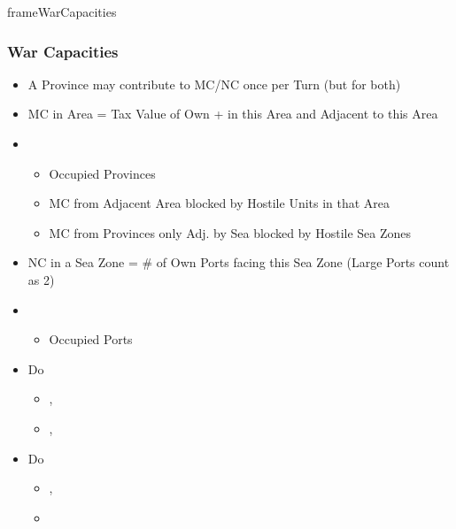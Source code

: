 \documentclass[10pt]{article}
\newlength{\fhWarCapacities} \setlength\fhWarCapacities{17\baselineskip}
\begin{document}
\begin{dynamiccontents*}{frameWarCapacities}\begin{eubox}{\fhWarCapacities}
	\subsubsection*{War Capacities }
	\begin{itemize}
		\item A Province may contribute to MC/NC once per Turn (but for both)
	\end{itemize}	
	\begin{itemize}
		\item MC in Area = Tax Value of Own \towns + \vassals in this Area and Adjacent to this Area
		\item {}
		\begin{itemize}
			\item Occupied Provinces
			\item MC from Adjacent Area blocked by Hostile Units in that Area
			\item MC from Provinces only Adj. by Sea blocked by Hostile Sea Zones
		\end{itemize}
	\end{itemize}
	\begin{itemize}
		\item NC in a Sea Zone = \# of Own Ports facing this Sea Zone (Large Ports count as 2)
		\item {}
		\begin{itemize}
			\item Occupied Ports
		\end{itemize}
	\end{itemize}
\end{eubox}\end{dynamiccontents*}

\begin{itemize}
	\item Do 
	\begin{itemize}
		\item {}, 
		\item {}, 
	\end{itemize}
	\item Do 
	\begin{itemize}
		\item {}, 
		\item {}
	\end{itemize}
\end{itemize}
\end{document}
